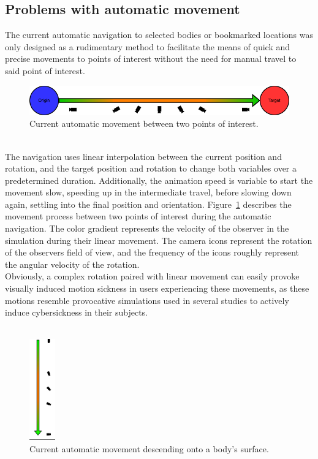 \subsection{Problems with automatic movement}\label{subsec:problems-with-automatic-movement}

The current automatic navigation to selected bodies or bookmarked locations was only designed as a rudimentary method
to facilitate the means of quick and precise movements to points of interest without the need for manual travel to
said point of interest.
\begin{figure}[h]
    \centering
    \includegraphics[width=\textwidth]{content/3_current_state/img/OldAutomaticNavigation}
    \caption{Current automatic movement between two points of interest.}
    \label{fig:old-auto-nav}
\end{figure}
\\
The navigation uses linear interpolation between the current position and rotation, and the target position and
rotation to change both variables over a predetermined duration.
Additionally, the animation speed is variable to start the movement slow, speeding up in the intermediate travel,
before slowing down again, settling into the final position and orientation.
Figure~\ref{fig:old-auto-nav} describes the movement process between two points of interest during the automatic
navigation.
The color gradient represents the velocity of the observer in the simulation during their linear movement.
The camera icons represent the rotation of the observers field of view, and the frequency of the icons roughly
represent the angular velocity of the rotation.
\\
Obviously, a complex rotation paired with linear movement can easily provoke visually induced motion sickness in
users experiencing these movements, as these motions resemble provocative simulations used in several studies to
actively induce cybersickness in their subjects.
\\
\\
\begin{figure}
    \centering
    \includegraphics[width=0.1\textwidth]{content/3_current_state/img/OldAutomaticNavigation_Landing}
    \caption{Current automatic movement descending onto a body's surface.}
    \label{fig:old-auto-nav-descend}
\end{figure}

